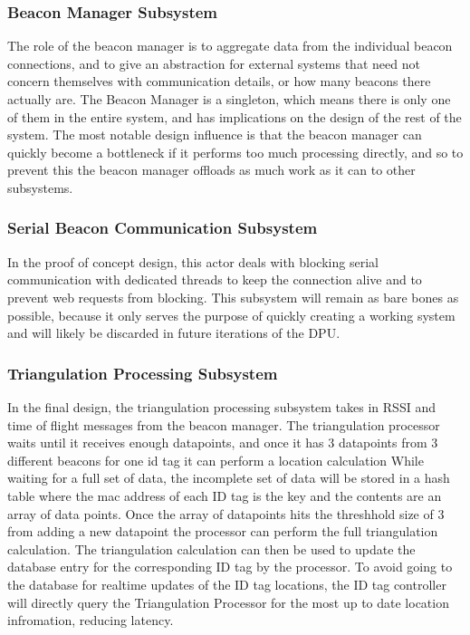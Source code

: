 \subsubsection{Beacon Manager Subsystem}
The role of the beacon manager is to aggregate data from the individual beacon connections, and to give an abstraction for external systems that need not concern themselves with communication details, or how many beacons there actually are.
The Beacon Manager is a singleton, which means there is only one of them in the entire system, and has implications on the design of the rest of the system.
The most notable design influence is that the beacon manager can quickly become a bottleneck if it performs too much processing directly, and so to prevent this the beacon manager offloads as much work as it can to other subsystems.

\bigskip
\subsubsection{Serial Beacon Communication Subsystem}
In the proof of concept design, this actor deals with blocking serial communication with dedicated threads to keep the connection alive and to prevent web requests from blocking.
This subsystem will remain as bare bones as possible, because it only serves the purpose of quickly creating a working system and will likely be discarded in future iterations of the DPU.

\bigskip
\subsubsection{Triangulation Processing Subsystem}
In the final design, the triangulation processing subsystem takes in RSSI and time of flight messages from the beacon manager.
The triangulation processor waits until it receives enough datapoints, and once it has 3 datapoints from 3 different beacons for one id tag it can perform a location calculation
While waiting for a full set of data, the incomplete set of data will be stored in a hash table where the mac address of each ID tag is the key and the contents are an array of data points.
Once the array of datapoints hits the threshhold size of 3 from adding a new datapoint the processor can perform the full triangulation calculation.
The triangulation calculation can then be used to update the database entry for the corresponding ID tag by the processor.
To avoid going to the database for realtime updates of the ID tag locations, the ID tag controller will directly query the Triangulation Processor for the most up to date location infromation, reducing latency.

